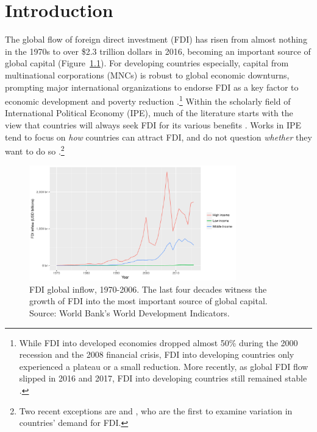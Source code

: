 \chapter{Introduction}
\label{chap:introduction}

The global flow of foreign direct investment (FDI) has risen from almost nothing
in the 1970s to over \$2.3 trillion dollars in 2016, becoming an important
source of global capital (Figure~\ref{fig:globalfdi}). For developing countries
especially, capital from multinational corporations (MNCs) is robust to global
economic downturns, prompting major international organizations to endorse FDI
as a key factor to economic development and poverty reduction
\citep{Mallampally1999, WorldEconomicForum2013}.\footnote{While FDI into
  developed economies dropped almost 50\% during the 2000 recession and the 2008
  financial crisis, FDI into developing countries only experienced a plateau or
  a small reduction. More recently, as global FDI flow slipped in 2016 and 2017,
  FDI into developing countries still remained stable \citep{UNCTAD2018}.} Within the scholarly
field of International Political Economy (IPE), much of the literature starts
with the view that countries will always seek FDI for its various benefits
\citep{Jensen2008b}. Works in IPE tend to focus on \textit{how} countries can
attract FDI, and do not question \textit{whether} they want to do so
\citep{Jensen2003, Li2003, Li2006, Ahlquist2006}.\footnote{Two recent exceptions
  are \citet{Pinto2013} and  \citet{Pandya2016}, who are the first to examine variation in
  countries' demand for FDI.}

\begin{figure}[tbp]
  \centering
  \includegraphics[width=0.8\textwidth,keepaspectratio]{../figure/global_fdi}
  \caption[FDI global inflow, 1970-2006.]{FDI global inflow, 1970-2006. The last
    four decades witness the growth of FDI into the most important source of
    global capital. Source: World Bank's World Development Indicators.}
  \label{fig:globalfdi}
\end{figure}

